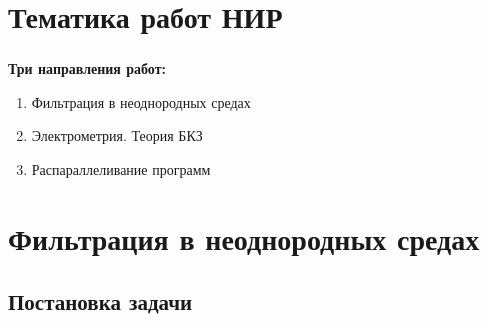 

\frame[plain]{\titlepage} %


\section{Тематика работ НИР}

\begin{frame}
\frametitle{\insertsection}

\textbf{Три направления работ:}
\begin{enumerate}
    \item Фильтрация в неоднородных средах
    \item Электрометрия. Теория БКЗ
    \item Распараллеливание программ
\end{enumerate}
\end{frame}


\section{Фильтрация в неоднородных средах}


\subsection{Постановка задачи}

